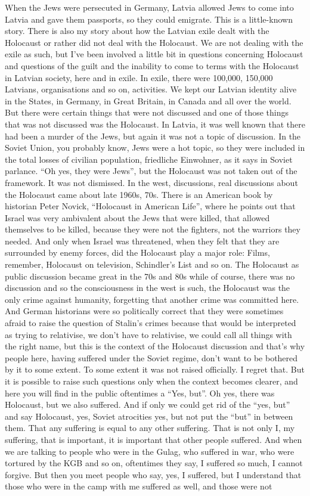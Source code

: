 When the Jews were persecuted in Germany, Latvia allowed Jews to come into Latvia and gave them passports, so they could emigrate. This is a little-known story. There is also my story about how the Latvian exile dealt with the Holocaust or rather did not deal with the Holocaust. We are not dealing with the exile as such, but I've been involved a little bit in questions concerning Holocaust and questions of the guilt and the inability to come to terms with the Holocaust in Latvian society, here and in exile. In exile, there were 100,000, 150,000 Latvians, organisations and so on, activities. We kept our Latvian identity alive in the States, in Germany, in Great Britain, in Canada and all over the world. But there were certain things that were not discussed and one of those things that was not discussed was the Holocaust. In Latvia, it was well known that there had been a murder of the Jews, but again it was not a topic of discussion. In the Soviet Union, you probably know, Jews were a hot topic, so they were included in the total losses of civilian population, friedliche Einwohner, as it says in Soviet parlance. “Oh yes, they were Jews”, but the Holocaust was not taken out of the framework. It was not dismissed. In the west, discussions, real discussions about the Holocaust came about late 1960s, 70s. There is an American book by historian Peter Novick, “Holocaust in American Life”, where he points out that Israel was very ambivalent about the Jews that were killed, that allowed themselves to be killed, because they were not the fighters, not the warriors they needed. And only when Israel was threatened, when they felt that they are surrounded by enemy forces, did the Holocaust play a major role: Films, remember, Holocaust on television, Schindler's List and so on. The Holocaust as public discussion became great in the 70s and 80s while of course, there was no discussion and so the consciousness in the west is such, the Holocaust was the only crime against humanity, forgetting that another crime was committed here. And German historians were so politically correct that they were sometimes afraid to raise the question of Stalin's crimes because that would be interpreted as trying to relativise, we don’t have to relativise, we could call all things with the right name, but this is the context of the Holocaust discussion and that's why people here, having suffered under the Soviet regime, don't want to be bothered by it to some extent. To some extent it was not raised officially. I regret that. But it is possible to raise such questions only when the context becomes clearer, and here you will find in the public oftentimes a “Yes, but”. Oh yes, there was Holocaust, but we also suffered. And if only we could get rid of the “yes, but” and say Holocaust, yes, Soviet atrocities yes, but not put the “but” in between them. That any suffering is equal to any other suffering. That is not only I, my suffering, that is important, it is important that other people suffered. And when we are talking to people who were in the Gulag, who suffered in war, who were tortured by the KGB and so on, oftentimes they say, I suffered so much, I cannot forgive. But then you meet people who say, yes, I suffered, but I understand that those who were in the camp with me suffered as well, and those were not 